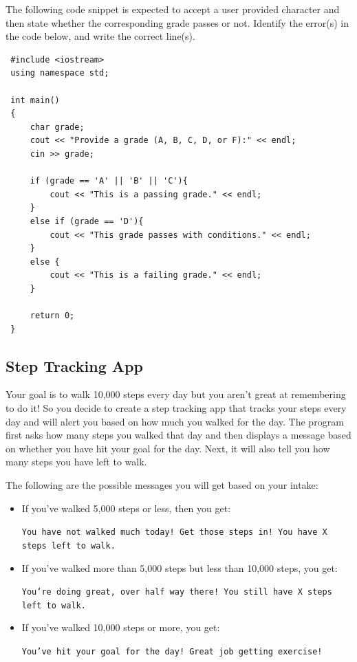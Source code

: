 \begin{multipart}
    The following code snippet is expected to accept a user provided character and then state whether the corresponding grade passes or not. Identify the error(s) in the code below, and write the correct line(s).
\end{multipart}

\begin{verbatim}
 #include <iostream>
 using namespace std;
 
 int main()
 {
     char grade;
     cout << "Provide a grade (A, B, C, D, or F):" << endl;
     cin >> grade;

     if (grade == 'A' || 'B' || 'C'){
         cout << "This is a passing grade." << endl;
     }
     else if (grade == 'D'){
         cout << "This grade passes with conditions." << endl;
     }
     else {
         cout << "This is a failing grade." << endl;
     }
 
     return 0; 
 }
\end{verbatim}


\subsection{Step Tracking App}
Your goal is to walk 10,000 steps every day but you aren't great at remembering to do it! So you decide to create a step tracking app that tracks your steps every day and will alert you based on how much you walked for the day. The program first asks how many steps you walked that day and then displays a message based on whether you have hit your goal for the day. Next, it will also tell you how many steps you have left to walk.

The following are the possible messages you will get based on your intake:

\begin{itemize}
    \item If you've walked 5,000 steps or less, then you get: 
    
    \texttt{You have not walked much today! Get those steps in! You have X steps left to walk.}
    
    \item If you’ve walked more than 5,000 steps but less than 10,000 steps, you get: 
    
    \texttt{You're doing great, over half way there! You still have X steps left to walk.}

    \item If you've walked 10,000 steps or more, you get:
    
    \texttt{You've hit your goal for the day! Great job getting exercise!}
\end{itemize}

